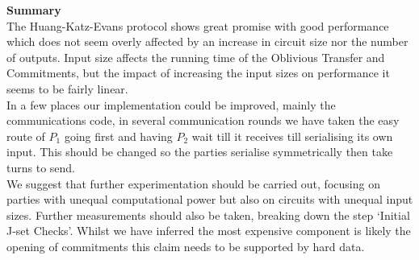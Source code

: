 \documentclass[ %
                    author={Nicholas Tutte},
                supervisor={Prof. Nigel Smart},
                    degree={MEng},
                     title={Secure Two Party Computation},
                  subtitle={A practical comparison of recent protocols},
                      type={Research - GG1K},
                      year={2015} ]{dissertation}
\begin{document}
				\noindent\textbf{Summary}\\

				The Huang-Katz-Evans protocol shows great promise with good performance which does not seem overly affected by an increase in circuit size nor the number of outputs. Input size affects the running time of the Oblivious Transfer and Commitments, but the impact of increasing the input sizes on performance it seems to be fairly linear.\\

				In a few places our implementation could be improved, mainly the communications code, in several communication rounds we have taken the easy route of $P_1$ going first and having $P_2$ wait till it receives till serialising its own input. This should be changed so the parties serialise symmetrically then take turns to send.\\

				We suggest that further experimentation should be carried out, focusing on parties with unequal computational power but also on circuits with unequal input sizes. Further measurements should also be taken, breaking down the step `Initial J-set Checks'. Whilst we have inferred the most expensive component is likely the opening of commitments this claim needs to be supported by hard data.
\end{document}
